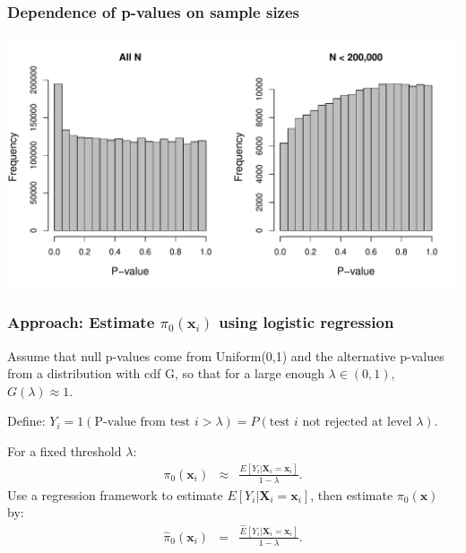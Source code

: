 \documentclass{beamer}
\newcommand{\bX}{\mathbf{X}}
\newcommand{\bx}{\mathbf{x}}
\begin{document}

\begin{frame}
\frametitle{Dependence of p-values on sample sizes}

\begin{center}
\includegraphics[scale=0.55]{Fig1-1.pdf} 
\end{center}

\end{frame}


\begin{frame}
\frametitle{Approach: Estimate $\pi_0(\bx_i)$ using logistic regression}

Assume that null p-values come from Uniform(0,1) and the alternative p-values from a distribution with cdf G,
so that for a large enough $\lambda \in (0,1)$, $G(\lambda) \approx 1$.

\vspace{0.5cm}
Define: $Y_i = 1(\mbox{P-value from test $i > \lambda$}) = P(\mbox{test $i$ not rejected at level $\lambda$})$.

\vspace{0.5cm}
For a fixed threshold $\lambda$:
\begin{eqnarray*}
\pi_0(\bx_i) &\approx& \frac{E[Y_i|\bX_i=\bx_i] }{1-\lambda}.
\end{eqnarray*}
Use a regression framework to estimate $E[Y_i|\bX_i=\bx_i]$, then estimate
$\pi_0(\bx)$ by:
\begin{eqnarray*}
\label{eq:est-pio-x}
\hat{\pi}_0(\bx_i) &=& \frac{\hat{E}[Y_i|\bX_i=\bx_i] }{1-\lambda}.
\end{eqnarray*}

\end{frame}
\end{document}
